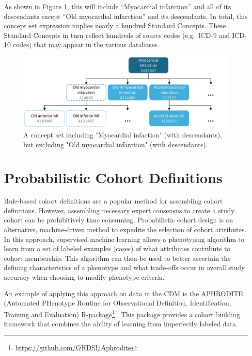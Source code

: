 \documentclass[11pt]{book}
\let\rmarkdownfootnote\footnote%
\def\footnote{\protect\rmarkdownfootnote}
\theoremstyle{definition}
\theoremstyle{definition}
\theoremstyle{definition}
\theoremstyle{remark}
\begin{document}
As shown in Figure \ref{fig:conceptSet}, this will include ``Myocardial
infarction'' and all of its descendants except ``Old myocardial
infarction'' and its descendants. In total, this concept set expression
implies nearly a hundred Standard Concepts. These Standard Concepts in
turn reflect hundreds of source codes (e.g.~ICD-9 and ICD-10 codes) that
may appear in the various databases.

\begin{figure}

{\centering \includegraphics[width=1\linewidth]{images/Cohorts/conceptSet} 

}

\caption{A concept set including "Myocardial infaction" (with descendants), but excluding "Old myocardial infarction" (with descendants).}\label{fig:conceptSet}
\end{figure}

\section{Probabilistic Cohort
Definitions}\label{probabilistic-cohort-definitions}

Rule-based cohort definitions are a popular method for assembling cohort
definitions. However, assembling necessary expert consensus to create a
study cohort can be prohibitively time consuming. Probabilistic cohort
design is an alternative, machine-driven method to expedite the
selection of cohort attributes. In this approach, supervised machine
learning allows a phenotyping algorithm to learn from a set of labeled
examples (cases) of what attributes contribute to cohort membership.
This algorithm can then be used to better ascertain the defining
characteristics of a phenotype and what trade-offs occur in overall
study accuracy when choosing to modify phenotype criteria.

An example of applying this approach on data in the CDM is the APHRODITE
(Automated PHenotype Routine for Observational Definition,
Identification, Training and Evaluation) R-package\footnote{\url{https://github.com/OHDSI/Aphrodite}}
. This package provides a cohort building framework that combines the
ability of learning from imperfectly labeled data.
\citep{Banda2017APHRODITE} 
\end{document}
